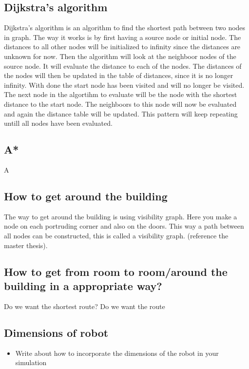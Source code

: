 \subsection{Dijkstra's algorithm}
Dijkstra's algorithm is an algorithm to find the shortest path between two nodes in graph. The way it works is by first having a source node or initial node. The distances to all other nodes will be initialized to infinity since the distances are unknown for now. Then the algorithm will look at the neighboor nodes of the source node. It will evaluate the distance to each of the nodes. The distances of the nodes will then be updated in the table of distances, since it is no longer infinity. With done the start node has been visited and will no longer be visited. The next node in the algortihm to evaluate will be the node with the shortest distance to the start node. The neighboors to this node will now be evaluated and again the distance table will be updated. This pattern will keep repeating untill all nodes have been evaluated. 

\subsection{A*}
A

\subsection{How to get around the building}
The way to get around the building is using visibility graph. Here you make a node on each portruding corner and also on the doors. This way a path between all nodes can be constructed, this is called a visibility graph.
(reference the master thesis).

\subsection{How to get from room to room/around the building in a appropriate way?}
Do we want the shortest route?
Do we want the route



\subsection{Dimensions of robot}
\begin{itemize}
    \item Write about how to incorporate the dimensions of the robot in your simulation
\end{itemize}


